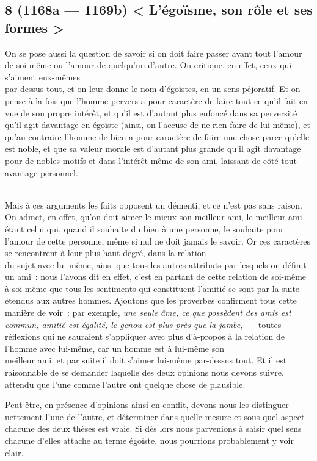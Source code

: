 \documentclass[french,twoside]{book} %
\begin{document}
\subsection[{8 (1168a — 1169b) < L’égoïsme, son rôle et ses formes >}]{8 (1168a — 1169b) < L’égoïsme, son rôle et ses formes >}
\noindent On se pose aussi la question de savoir si on doit faire passer avant tout l’amour de soi-même ou l’amour de quelqu’un d’autre. On critique, en effet, ceux qui s’aiment eux-mêmes \\
par-dessus tout, et on leur donne le nom d’égoïstes, en un sens péjoratif. Et on pense à la fois que l’homme pervers a pour caractère de faire tout ce qu’il fait en vue de son propre intérêt, et qu’il est d’autant plus enfoncé dans sa perversité qu’il agit davantage en égoïste (ainsi, on l’accuse de ne rien faire de lui-même), et qu’au contraire l’homme de bien a pour caractère de faire une chose parce qu’elle est noble, et que sa valeur morale est d’autant plus grande qu’il agit davantage pour de nobles motifs et dans l’intérêt même de son ami, laissant de côté tout avantage personnel.\par
\\
Mais à ces arguments les faits opposent un démenti, et ce  n’est pas sans raison. On admet, en effet, qu’on doit aimer le mieux son meilleur ami, le meilleur ami étant celui qui, quand il souhaite du bien à une personne, le souhaite pour l’amour de cette personne, même si nul ne doit jamais le savoir. Or ces caractères se rencontrent à leur plus haut degré, dans la relation \\
du sujet avec lui-même, ainsi que tous les autres attributs par lesquels on définit un ami : nous l’avons dit en effet, c’est en partant de cette relation de soi-même à soi-même que tous les sentiments qui constituent l’amitié se sont par la suite étendus aux autres hommes. Ajoutons que les proverbes confirment tous cette manière de voir : par exemple, {\itshape une seule âme, ce que possèdent des amis est commun, amitié est égalité, le genou est plus près que la jambe}, — toutes réflexions qui ne sauraient s’appliquer avec plus d’à-propos à la relation de l’homme avec lui-même, car un homme est à lui-même son \\
meilleur ami, et par suite il doit s’aimer lui-même par-dessus tout. Et il est raisonnable de se demander laquelle des deux opinions nous devons suivre, attendu que l’une comme l’autre ont quelque chose de plausible.\par
Peut-être, en présence d’opinions ainsi en conflit, devons-nous les distinguer nettement l’une de l’autre, et déterminer dans quelle mesure et sous quel aspect chacune des deux thèses est vraie. Si dès lors nous parvenions à saisir quel sens chacune d’elles attache au terme égoïste, nous pourrions probablement y voir clair.\par
\end{document}
